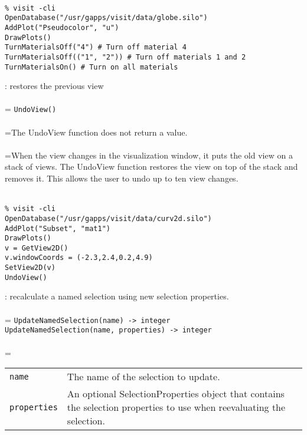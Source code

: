 \documentclass[10pt,a4paper]{report}
\begin{document}
\\[-6mm]
\begin{verbatim}% visit -cli
OpenDatabase("/usr/gapps/visit/data/globe.silo")
AddPlot("Pseudocolor", "u")
DrawPlots()
TurnMaterialsOff("4") # Turn off material 4
TurnMaterialsOff(("1", "2")) # Turn off materials 1 and 2
TurnMaterialsOn() # Turn on all materials
\end{verbatim}
\newpage


{}
: restores the previous view\\[-3mm]

 \\ 
\hangindent=\parindent 
\verb!UndoView()!\\ [-3mm]

 \\ 
\hangindent=\parindent The UndoView function does not return a value. \\[-3mm] 

 \\ 
\hangindent=\parindent When the view changes in the visualization window, it puts the old view on a stack of views. The UndoView function restores the view on top of the stack and removes it. This allows the user to undo up to ten view changes. \\[-3mm] 

\\[-6mm]
\begin{verbatim}% visit -cli
OpenDatabase("/usr/gapps/visit/data/curv2d.silo")
AddPlot("Subset", "mat1")
DrawPlots()
v = GetView2D()
v.windowCoords = (-2.3,2.4,0.2,4.9)
SetView2D(v)
UndoView()
\end{verbatim}
\newpage


{}
: recalculate a named selection using new selection properties.\\[-3mm]

 \\ 
\hangindent=\parindent 
\verb!UpdateNamedSelection(name) -> integer!\\ 
\verb!UpdateNamedSelection(name, properties) -> integer!\\ [-3mm]

 \\ 
\hangindent=\parindent 
\begin{tabular}{lp{9cm}}
\verb!name! & The name of the selection to update. \\
\verb!properties! & An optional SelectionProperties object that contains the selection properties to use when reevaluating the selection. \\
\end{tabular} \\[-2mm]
\end{document}
